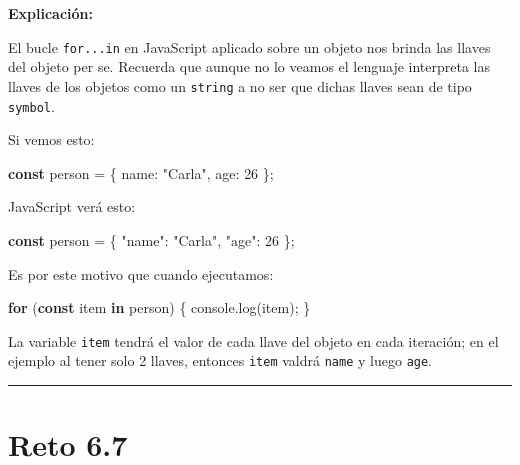 \documentclass[
  letterpaper,
  DIV=11,
  numbers=noendperiod]{scrreprt}
\newenvironment{Shaded}{\begin{snugshade}}{\end{snugshade}}
\newcommand{\BuiltInTok}[1]{\textcolor[rgb]{0.00,0.23,0.31}{#1}}
\newcommand{\ControlFlowTok}[1]{\textcolor[rgb]{0.00,0.23,0.31}{\textbf{#1}}}
\newcommand{\DataTypeTok}[1]{\textcolor[rgb]{0.68,0.00,0.00}{#1}}
\newcommand{\DecValTok}[1]{\textcolor[rgb]{0.68,0.00,0.00}{#1}}
\newcommand{\FunctionTok}[1]{\textcolor[rgb]{0.28,0.35,0.67}{#1}}
\newcommand{\KeywordTok}[1]{\textcolor[rgb]{0.00,0.23,0.31}{\textbf{#1}}}
\newcommand{\NormalTok}[1]{\textcolor[rgb]{0.00,0.23,0.31}{#1}}
\newcommand{\OperatorTok}[1]{\textcolor[rgb]{0.37,0.37,0.37}{#1}}
\newcommand{\StringTok}[1]{\textcolor[rgb]{0.13,0.47,0.30}{#1}}
\begin{document}
\textbf{Explicación:}

El bucle \texttt{for...in} en JavaScript aplicado sobre un objeto nos
brinda las llaves del objeto per se. Recuerda que aunque no lo veamos el
lenguaje interpreta las llaves de los objetos como un \texttt{string} a
no ser que dichas llaves sean de tipo \texttt{symbol}.

Si vemos esto:

\begin{Shaded}
\begin{Highlighting}[]
\KeywordTok{const}\NormalTok{ person }\OperatorTok{=}\NormalTok{ \{}
  \DataTypeTok{name}\OperatorTok{:} \StringTok{"Carla"}\OperatorTok{,}
  \DataTypeTok{age}\OperatorTok{:} \DecValTok{26}
\NormalTok{\}}\OperatorTok{;}
\end{Highlighting}
\end{Shaded}

JavaScript verá esto:

\begin{Shaded}
\begin{Highlighting}[]
\KeywordTok{const}\NormalTok{ person }\OperatorTok{=}\NormalTok{ \{}
  \StringTok{"name"}\OperatorTok{:} \StringTok{"Carla"}\OperatorTok{,}
  \StringTok{"age"}\OperatorTok{:} \DecValTok{26}
\NormalTok{\}}\OperatorTok{;}
\end{Highlighting}
\end{Shaded}

Es por este motivo que cuando ejecutamos:

\begin{Shaded}
\begin{Highlighting}[]
\ControlFlowTok{for}\NormalTok{ (}\KeywordTok{const}\NormalTok{ item }\KeywordTok{in}\NormalTok{ person) \{}
  \BuiltInTok{console}\OperatorTok{.}\FunctionTok{log}\NormalTok{(item)}\OperatorTok{;}
\NormalTok{\}}
\end{Highlighting}
\end{Shaded}

La variable \texttt{item} tendrá el valor de cada llave del objeto en
cada iteración; en el ejemplo al tener solo 2 llaves, entonces
\texttt{item} valdrá \texttt{name} y luego \texttt{age}.

\begin{center}\rule{0.5\linewidth}{0.5pt}\end{center}

\section{Reto 6.7}\label{sec-sol-cap6-reto7}
\end{document}
